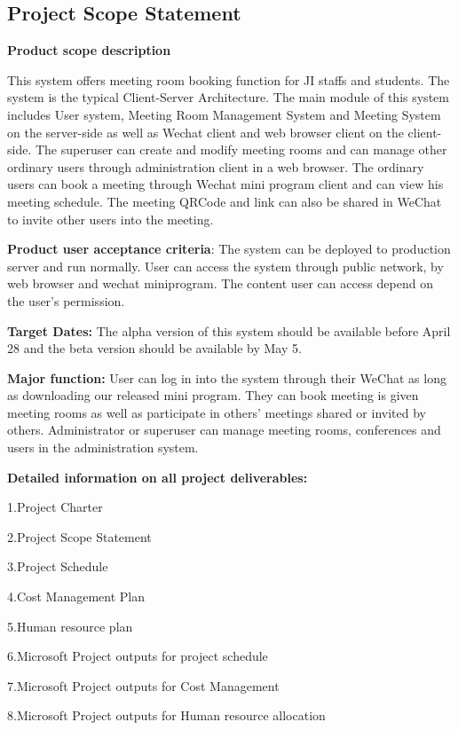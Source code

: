 \documentclass[runningheads]{llncs}
\begin{document}
\subsection{Project Scope Statement}

\textbf{Product scope description}

This system offers meeting room booking function for JI staffs and students. The system is the typical Client-Server Architecture. The main module of this system includes User system, Meeting Room Management System and Meeting System on the server-side as well as Wechat client and web browser client on the client-side. The superuser can create and modify meeting rooms and can manage other ordinary users through administration client in a web browser. The ordinary users can book a meeting through Wechat mini program client and can view his meeting schedule. The meeting QRCode and link can also be shared in WeChat to invite other users into the meeting. 

\noindent\textbf{Product user acceptance criteria}:
The system can be deployed to production server and run normally. User can access the system through public network, by web browser and wechat miniprogram. The content user can access depend on the user's permission. 

\noindent\textbf{Target Dates:} The alpha version of this system should be available before April 28 and the beta version should be available by May 5.

\noindent\textbf{Major function:} User can log in into the system through their WeChat as long as downloading our released mini program. They can book meeting is given meeting rooms as well as participate in others' meetings shared or invited by others. Administrator or superuser can manage meeting rooms, conferences and users in the administration system.

\noindent\textbf{Detailed information on all project deliverables:}

1.Project Charter

2.Project Scope Statement

3.Project Schedule

4.Cost Management Plan

5.Human resource plan

6.Microsoft Project outputs for project schedule

7.Microsoft Project outputs for Cost Management

8.Microsoft Project outputs for Human resource allocation
\end{document}
